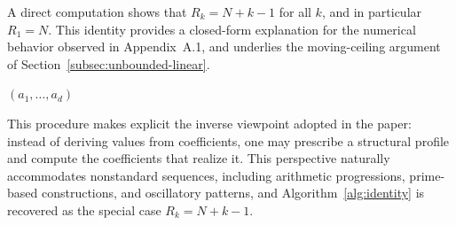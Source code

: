 \documentclass[11pt,a4paper]{amsart}
\theoremstyle{plain}
\theoremstyle{definition}
\theoremstyle{remark}
\begin{document}
\medskip
A direct computation shows that $R_k = N + k - 1$ for all $k$, and in particular $R_1 = N$. This identity provides a closed-form explanation for the numerical behavior observed in Appendix~A.1, and underlies the moving-ceiling argument of Section~\ref{subsec:unbounded-linear}.

\vspace{1em}
\begin{algorithm}[H]
\caption{Reconstruction of coefficients from a target sequence}
\label{alg:design_gen}
\BlankLine
{}
\Return $(a_1,\dots,a_d)$\;
\end{algorithm}

This procedure makes explicit the inverse viewpoint adopted in the paper: instead of deriving values from coefficients, one may prescribe a structural profile and compute the coefficients that realize it. This perspective naturally accommodates nonstandard sequences, including arithmetic progressions, prime-based constructions, and oscillatory patterns, and Algorithm~\ref{alg:identity} is recovered as the special case $R_k = N+k-1$.

\newpage
\printbibliography
\end{document}
